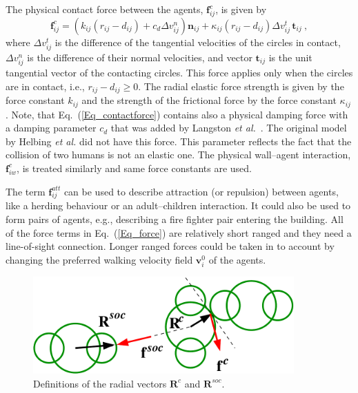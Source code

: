 \documentclass[12pt,a4paper,final,twoside]{stylevk}
\begin{document}
The physical contact force between the agents, $\mathbf{f}_{ij}^{c}$,
is given by
%
\begin{equation}\label{Eq_contactforce}
  \mathbf{f}_{ij}^{c} = \left( k_{ij} (r_{ij}-d_{ij}) + c_d \Delta
    v_{ij}^{n} \right) \mathbf{n}_{ij} + \kappa_{ij} (r_{ij}-d_{ij})\Delta
  v_{ij}^{t} \, \mathbf{t}_{ij} ~,
\end{equation}
%
where $\Delta v_{ij}^{t}$ is the difference of the tangential
velocities of the circles in contact, $\Delta v_{ij}^{n}$ is the
difference of their normal velocities, and vector $\mathbf{t}_{ij}$ is
the unit tangential vector of the contacting circles.  This force
applies only when the circles are in contact, i.e.,
$r_{ij}-d_{ij} \ge 0$.  The radial elastic force strength is given by
the force constant $k_{ij}$ and the strength of the frictional force
by the force constant $\kappa_{ij}$.  Note, that
Eq.~(\ref{Eq_contactforce}) contains also a physical damping force with
a damping parameter $c_d$ that was added by Langston \emph{et
  al.}~\cite{Langston06}.  The original model by Helbing {\em et al.}
did not have this force.  This parameter reflects the fact that the
collision of two humans is not an elastic one.  The physical
wall--agent interaction, $ \mathbf{f}^{c}_{iw}$, is treated similarly
and same force constants are used.


The term $\mathbf{f}_{ij}^{att}$ can be used to describe attraction
(or repulsion) between agents, like a herding behaviour or an
adult--children interaction.  It could also be used to form pairs of
agents, e.g., describing a fire fighter pair entering the
building.  All of the force terms in Eq.~(\ref{Eq_force}) are relatively
short ranged and they need a line-of-sight connection.  Longer ranged
forces could be taken in to account by changing the preferred walking
velocity field $ \mathbf{v}_i^0 $ of the agents.

%
\begin{figure}[!bt]
  \centerline{\includegraphics[clip=true, width=100mm]{FIGURES/body_shape_forces} }
\caption{Definitions of the radial vectors $\mathbf{R}^c$ and
  $\mathbf{R}^{soc}$. }\label{Fig_BodySize} 
\end{figure}
%
\end{document}
